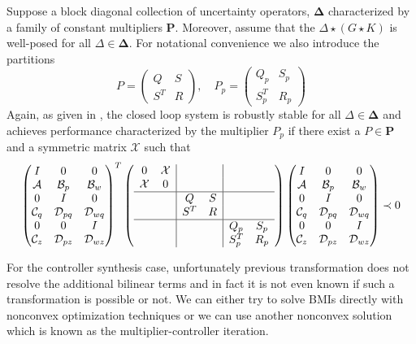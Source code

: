 Suppose a block diagonal collection of uncertainty operators, $\bm{\Delta}$ characterized by a family of constant multipliers $\mathbf{P}$. Moreover,
assume that the $\Delta\star(G\star K)$ is well-posed for all $\Delta\in\bm{\Delta}$.
For notational convenience we also introduce the partitions 
\[
P=\begin{pmatrix}Q&S\\ S^T&R\end{pmatrix},\quad P_p=\begin{pmatrix}Q_p&S_p\\ S^T_p&R_p\end{pmatrix}
\]
Again, as given in , the closed loop system is robustly stable for all $\Delta\in\bm{\Delta}$ and achieves performance characterized 
by the multiplier $P_p$ if there exist a $P\in\mathbf{P}$ and a symmetric matrix $\mathcal{X}$ such that 
\begin{equation}
\begin{pmatrix}
I&0&0\\\mathcal{A}&\mathcal{B}_p&\mathcal{B}_w\\
0&I&0\\\mathcal{C}_q&\mathcal{D}_{pq}&\mathcal{D}_{wq}\\
0&0&I\\\mathcal{C}_z&\mathcal{D}_{pz}&\mathcal{D}_{wz}
\end{pmatrix}^T
\left(
\begin{array}{cc|cc|cc}
	0&\mathcal{X}&&&&\\
	\mathcal{X}&0&&&&\\\hline
	&&Q&S&&\\
	&&S^T&R&&\\\hline
	&&&&Q_p&S_p\\
	&&&&S_p^T&R_p\\
\end{array}
\right)
\begin{pmatrix}
I&0&0\\\mathcal{A}&\mathcal{B}_p&\mathcal{B}_w\\
0&I&0\\\mathcal{C}_q&\mathcal{D}_{pq}&\mathcal{D}_{wq}\\
0&0&I\\\mathcal{C}_z&\mathcal{D}_{pz}&\mathcal{D}_{wz}
\end{pmatrix}\prec 0
\label{eq:analysisLMI}
\end{equation}

%
%

For the controller synthesis case, unfortunately previous transformation does not resolve the additional bilinear terms and in fact it is not even known 
if such a transformation is possible or not. We can either try to solve BMIs directly with nonconvex optimization techniques or we can use another nonconvex 
solution which is known as the multiplier-controller iteration. 

